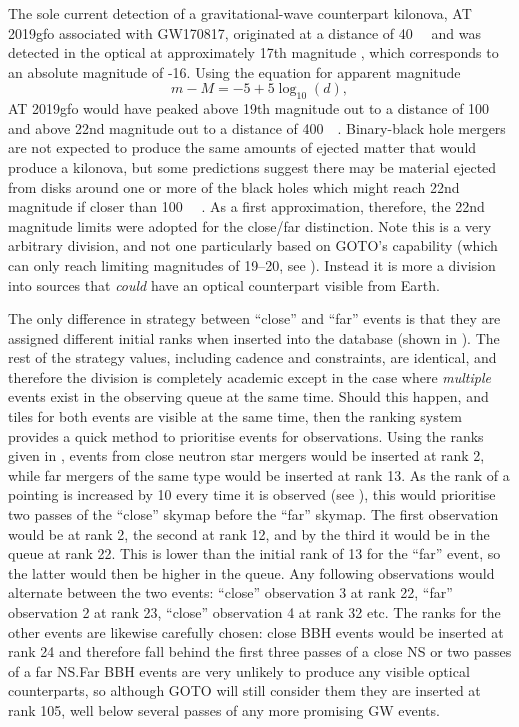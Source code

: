 \begin{colsection}
The sole current detection of a gravitational-wave counterpart kilonova, AT 2019gfo associated with GW170817, originated at a distance of \SI{40}{\mega\parsec} and was detected in the optical at approximately 17th magnitude \citep[Swope first observed the kilonova 10.9 hours after the event with \textit{i}$=17.057\pm0.018$ mag,][]{GW170817_Swope}, which corresponds to an absolute magnitude of -16. Using the equation for apparent magnitude
%
\begin{equation}
    m-M = -5 +5\log_{10}(d),
    \label{eq:absolute_magnitude}
\end{equation}
%
AT 2019gfo would have peaked above 19th magnitude out to a distance of \SI{100}{\mega\parsec} and above 22nd magnitude out to a distance of \SI{400}{\mega\parsec}. Binary-black hole mergers are not expected to produce the same amounts of ejected matter that would produce a kilonova, but some predictions suggest there may be material ejected from disks around one or more of the black holes which might reach 22nd magnitude if closer than \SI{100}{\mega\parsec} \citep{BBH_EM}. As a first approximation, therefore, the 22nd magnitude limits were adopted for the close/far distinction. Note this is a very arbitrary division, and not one particularly based on GOTO's capability (which can only reach limiting magnitudes of 19--20, see ). Instead it is more a division into sources that \emph{could} have an optical counterpart visible from Earth.

The only difference in strategy between ``close'' and ``far'' events is that they are assigned different initial ranks when inserted into the database (shown in ). The rest of the strategy values, including cadence and constraints, are identical, and therefore the division is completely academic except in the case where \emph{multiple} events exist in the observing queue at the same time. Should this happen, and tiles for both events are visible at the same time, then the ranking system provides a quick method to prioritise events for observations. Using the ranks given in , events from close neutron star mergers would be inserted at rank 2, while far mergers of the same type would be inserted at rank 13. As the rank of a pointing is increased by 10 every time it is observed (see ), this would prioritise two passes of the ``close'' skymap before the ``far'' skymap. The first observation would be at rank 2, the second at rank 12, and by the third it would be in the queue at rank 22. This is lower than the initial rank of 13 for the ``far'' event, so the latter would then be higher in the queue. Any following observations would alternate between the two events: ``close'' observation 3 at rank 22, ``far'' observation 2 at rank 23, ``close'' observation 4 at rank 32 etc. The ranks for the other events are likewise carefully chosen: close BBH events would be inserted at rank 24 and therefore fall behind the first three passes of a close NS or two passes of a far NS.\@ Far BBH events are very unlikely to produce any visible optical counterparts, so although GOTO will still consider them they are inserted at rank 105, well below several passes of any more promising GW events.


\end{colsection}

